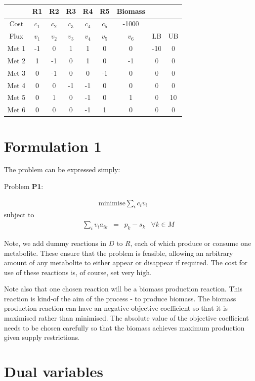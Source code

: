 \documentclass[12pt,twoside,fleqn,a4paper]{article}
\begin{document}
\begin{tabular}{c | c c c c c c  | c c}
        & R1 &  R2 &  R3 &  R4 &  R5 &  Biomass & & \\ \hline
 Cost   & $c_1$ & $c_2$ & $c_3$ & $c_4$ & $c_5$ & -1000 & \\ \hline
 Flux   & $v_1$ & $v_2$ & $v_3$ & $v_4$ & $v_5$ & $v_6$ & LB & UB \\ \hline
  Met 1 & -1 &   0 &   1 &   1 &   0 &   0 & -10 & 0\\
  Met 2 &  1 &  -1 &   0 &   1 &   0 &  -1 & 0 & 0  \\
  Met 3 &  0 &  -1 &   0 &   0 &  -1 &   0 & 0 & 0   \\
  Met 4 &  0 &   0 &  -1 &  -1 &   0 &   0 & 0 & 0   \\
  Met 5 &  0 &   1 &   0 &  -1 &   0 &   1 & 0 & 10   \\
  Met 6 &  0 &   0 &   0 &  -1 &   1 &   0 & 0 & 0
\end{tabular}

\section{Formulation 1}

The problem can be expressed simply:

Problem {\bf P1}:

\begin{eqnarray}
  \mbox{minimise} \sum_i c_i v_i & & 
\end{eqnarray}
subject to
\begin{eqnarray}
  \sum_i v_i a_{ik} & = & p_k - s_k \;\;\; \forall k \in M \label{eqn:metbal}
\end{eqnarray}

Note, we add dummy reactions in $D$ to $R$, each of which produce or consume
one metabolite. These ensure that the problem is feasible,
allowing an arbitrary amount of any metabolite to either appear or
disappear if required. The cost for use of these reactions is, of
course, set very high.

Note also that one chosen reaction will be a biomass production
reaction. This reaction is kind-of the aim of the process - to produce
biomass. The biomass production reaction can have an negative
objective coefficient so that it is maximised rather than
minimised. The absolute value of the objective coefficient needs to be
chosen carefully so that the biomass achieves maximum production given
supply restrictions.

\section{Dual variables}
\end{document}
